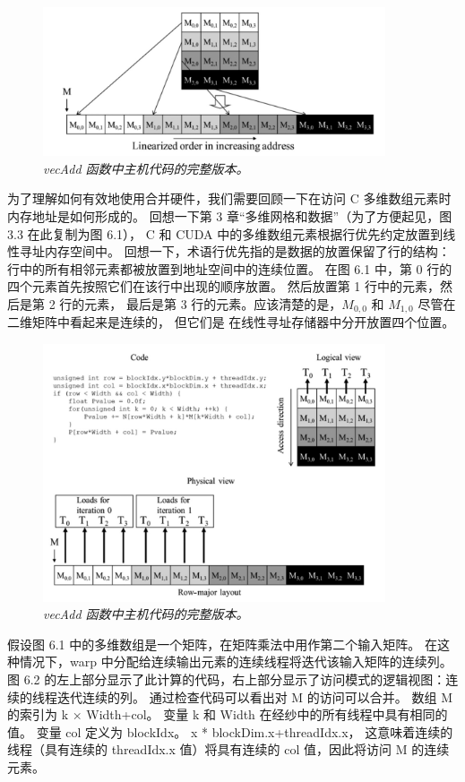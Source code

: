 \begin{figure}[H]
	\centering
	\includegraphics[width=0.9\textwidth]{figs/F6.1.png}
	\caption{\textit{\color{red} vecAdd 函数中主机代码的完整版本。}}
\end{figure}

为了理解如何有效地使用合并硬件，我们需要回顾一下在访问 C 多维数组元素时内存地址是如何形成的。 
回想一下第 3 章“多维网格和数据”（为了方便起见，图 3.3 在此复制为图 6.1），
C 和 CUDA 中的多维数组元素根据行优先约定放置到线性寻址内存空间中。 
回想一下，术语行优先指的是数据的放置保留了行的结构：行中的所有相邻元素都被放置到地址空间中的连续位置。 
在图 6.1 中，第 0 行的四个元素首先按照它们在该行中出现的顺序放置。 然后放置第 1 行中的元素，然后是第 2 行的元素，
最后是第 3 行的元素。应该清楚的是，$M_{0,0}$ 和 $M_{1,0}$ 尽管在二维矩阵中看起来是连续的，
但它们是 在线性寻址存储器中分开放置四个位置。

\begin{figure}[H]
	\centering
	\includegraphics[width=0.9\textwidth]{figs/F6.2.png}
	\caption{\textit{\color{red} vecAdd 函数中主机代码的完整版本。}}
\end{figure}

假设图 6.1 中的多维数组是一个矩阵，在矩阵乘法中用作第二个输入矩阵。 
在这种情况下，warp 中分配给连续输出元素的连续线程将迭代该输入矩阵的连续列。 
图 6.2 的左上部分显示了此计算的代码，右上部分显示了访问模式的逻辑视图：连续的线程迭代连续的列。 
通过检查代码可以看出对 M 的访问可以合并。 数组 M 的索引为 k × Width+col。 
变量 k 和 Width 在经纱中的所有线程中具有相同的值。 变量 col 定义为 blockIdx。 x * blockDim.x+threadIdx.x，
这意味着连续的线程（具有连续的 threadIdx.x 值）将具有连续的 col 值，因此将访问 M 的连续元素。

